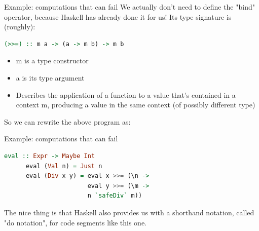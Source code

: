 \documentclass{beamer}
\begin{document}
\begin{frame}[fragile]{Example: computations that can fail}
    We actually don't need to define the "bind" operator, because Haskell
    has already done it for us! Its type signature is (roughly):

    \begin{minipage}{\linewidth} \hspace{1cm}
    \begin{lstlisting}[language=haskell, numbers=none, frame=none]
      (>>=) :: m a -> (a -> m b) -> m b
    \end{lstlisting}
    \end{minipage} \hspace{1cm}

    \begin{itemize}
        \item m is a type constructor
        \item a is its type argument
        \item Describes the application of a function to a value that's
              contained in a context m, producing a value in the same
              context (of possibly different type)
    \end{itemize}

    \bigbreak
    So we can rewrite the above program as:
\end{frame}

\begin{frame}[fragile]{Example: computations that can fail}
    \begin{minipage}{\linewidth} \hspace{1cm}
    \begin{lstlisting}[language=haskell, numbers=none, frame=none]
      eval :: Expr -> Maybe Int
      eval (Val n) = Just n
      eval (Div x y) = eval x >>= (\n ->
                       eval y >>= (\m ->
                       n `safeDiv` m))
    \end{lstlisting}
    \end{minipage} \hspace{1cm}

    The nice thing is that Haskell also provides us with a shorthand
    notation, called "do notation", for code segments like this one.
\end{frame}
\end{document}
